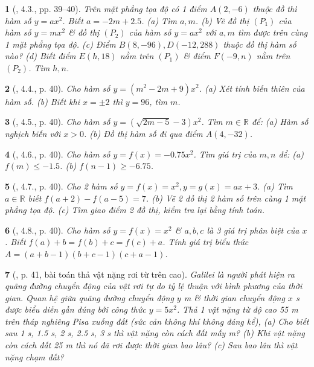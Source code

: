 \documentclass{article}
\newtheorem{baitoan}{}
\begin{document}
\begin{baitoan}[\cite{Binh_boi_duong_Toan_9_tap_2}, 4.3., pp. 39--40]
	Trên mặt phẳng tọa độ có 1 điểm $A(2,-6)$ thuộc đồ thì hàm số $y = ax^2$. Biết $a = -2m + 2.5$. (a) Tìm $a,m$. (b) Vẽ đồ thị $(P_1)$ của hàm số $y = mx^2$ \& đồ thị $(P_2)$ của hàm số $y = ax^2$ với $a,m$ tìm được trên cùng 1 mặt phẳng tọa độ. (c) Điểm $B(8,-96),D(-12,288)$ thuộc đồ thị hàm số nào? (d) Biết điểm $E(h,18)$ nằm trên $(P_1)$ \& điểm $F(-9,n)$ nằm trên $(P_2)$. Tìm $h,n$.
\end{baitoan}

\begin{baitoan}[\cite{Binh_boi_duong_Toan_9_tap_2}, 4.4., p. 40]
	Cho hàm số $y = (m^2 - 2m + 9)x^2$. (a) Xét tính biến thiên của hàm số. (b) Biết khi $x = \pm2$ thì $y = 96$, tìm $m$.
\end{baitoan}

\begin{baitoan}[\cite{Binh_boi_duong_Toan_9_tap_2}, 4.5., p. 40]
	Cho hàm số $y = (\sqrt{2m - 5} - 3)x^2$. Tìm $m\in\mathbb{R}$ để: (a) Hàm số nghịch biến với $x > 0$. (b) Đồ thị hàm số đi qua điểm $A(4,-32)$.
\end{baitoan}

\begin{baitoan}[\cite{Binh_boi_duong_Toan_9_tap_2}, 4.6., p. 40]
	Cho hàm số $y = f(x) = -0.75x^2$. Tìm giá trị của $m,n$ để: (a) $f(m)\le-1.5$. (b) $f(n - 1)\ge-6.75$.
\end{baitoan}

\begin{baitoan}[\cite{Binh_boi_duong_Toan_9_tap_2}, 4.7., p. 40]
	Cho 2 hàm số $y = f(x) = x^2,y = g(x) = ax + 3$. (a) Tìm $a\in\mathbb{R}$ biết $f(a + 2) - f(a - 5) = 7$. (b) Vẽ 2 đồ thị 2 hàm số trên cùng 1 mặt phẳng tọa độ. (c) Tìm giao điểm 2 đồ thị, kiểm tra lại bằng tính toán.
\end{baitoan}

\begin{baitoan}[\cite{Binh_boi_duong_Toan_9_tap_2}, 4.8., p. 40]
	Cho hàm số $y = f(x) = x^2$ \& $a,b,c$ là 3 giá trị phân biệt của $x$. Biết $f(a) + b = f(b) + c = f(c) + a$. Tính giá trị biểu thức $A = (a + b - 1)(b + c - 1)(c + a - 1)$.
\end{baitoan}

\begin{baitoan}[\cite{Binh_boi_duong_Toan_9_tap_2}, p. 41, bài toán thả vật nặng rơi từ trên cao]
	Galilei là người phát hiện ra quãng đường chuyển động của vật rơi tự do tỷ lệ thuận với bình phương của thời gian. Quan hệ giữa quãng đường chuyển động $y$ {\rm m} \& thời gian chuyển động $x$ {\rm s} được biểu diễn gần đúng bởi công thức $y = 5x^2$. Thả 1 vật nặng từ độ cao {\rm55 m} trên tháp nghiêng Pisa xuống đất (sức cản không khí không đáng kể), (a) Cho biết sau {\rm1 s, 1.5 s, 2 s, 2.5 s, 3 s} thì vật nặng còn cách đất mấy {\rm m}? (b) Khi vật nặng còn cách đất {\rm25 m} thì nó đã rơi được thời gian bao lâu? (c) Sau bao lâu thì vật nặng chạm đất?
\end{baitoan}
\end{document}
